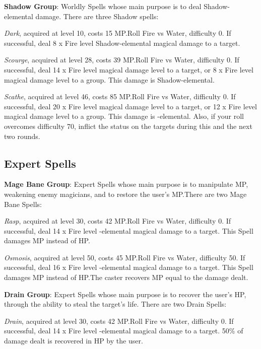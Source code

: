 \begin{multicols}{2}
    \textbf{Shadow Group}: Worldly Spells whose main purpose is to deal Shadow-elemental damage. There are three Shadow spells:
    
    \textit{Dark}, acquired at level 10, costs 15 MP.\@{}Roll Fire vs Water, difficulty 0. If successful, deal 8 x Fire level {Shadow}-elemental magical damage to a target.
    
    \textit{Scourge}, acquired at level 28, costs 39 MP.\@{}Roll Fire vs Water, difficulty 0. If successful, deal 14 x Fire level magical damage level to a target, or 8 x Fire level magical damage level to a group. This damage is {Shadow}-elemental.
    
    \textit{Scathe}, acquired at level 46, costs 85 MP.\@{}Roll Fire vs Water, difficulty 0. If successful, deal 20 x Fire level magical damage level to a target, or 12 x Fire level magical damage level to a group. This damage is -elemental. Also, if your roll overcomes difficulty 70, inflict the  status on the targets during this and the next two rounds.
    
    \subsection{Expert Spells}\label{subsec:black-expert}

    \textbf{Mage Bane Group}: Expert Spells whose main purpose is to manipulate MP, weakening enemy magicians, and to restore the user's MP.\@{}There are two Mage Bane Spells:
    
    \textit{Rasp}, acquired at level 30, costs 42 MP.\@{}Roll Fire vs Water, difficulty 0. If successful, deal 14 x Fire level -elemental magical damage to a target. This Spell damages MP instead of HP.\@{}
    
    \textit{Osmosis}, acquired at level 50, costs 45 MP.\@{}Roll Fire vs Water, difficulty 50. If successful, deal 16 x Fire level -elemental magical damage to a target. This Spell damages MP instead of HP.\@{}The caster recovers MP equal to the damage dealt.
    
    \textbf{Drain Group}: Expert Spells whose main purpose is to recover the user's HP, through the ability to steal the target’s life. There are two Drain Spells:
    
    \textit{Drain}, acquired at level 30, costs 42 MP.\@{}Roll Fire vs Water, difficulty 0. If successful, deal 14 x Fire level -elemental magical damage to a target. 50\% of damage dealt is recovered in HP by the user.
    

\end{multicols}
